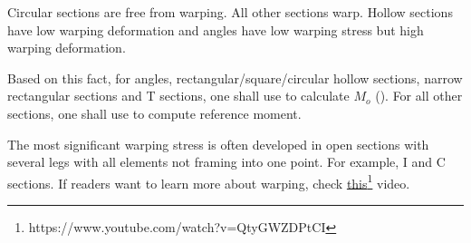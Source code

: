 Circular sections are free from warping. All other sections warp. Hollow sections have low warping deformation and angles have low warping stress but high warping deformation.
\begin{figure}[H]
\footnotesize\centering
{}
\end{figure}
Based on this fact, for angles, rectangular/square/circular hollow sections, narrow rectangular sections and T sections, one shall use  to calculate $M_o$ (). For all other sections, one shall use  to compute reference moment.

The most significant warping stress is often developed in open sections with several legs with all elements not framing into one point. For example, I and C sections. If readers want to learn more about warping, check \href{https://www.youtube.com/watch?v=QtyGWZDPtCI}{this}\footnote{https://www.youtube.com/watch?v=QtyGWZDPtCI} video.

